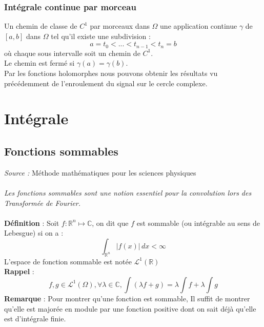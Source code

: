 \documentclass[a4paper]{book}
\begin{document}
\subsection{Intégrale continue par morceau}
Un chemin de classe de $C^1$ par morceaux dans $\Omega$ une application continue
$\gamma$ de $[a,b]$ dans $\Omega$ tel qu'il existe une subdivision :
\[
	a = t_0 < ... < t_{n-1} < t_n = b
\]
où chaque sous intervalle soit un chemin de $C^1$.\\ 

Le chemin est fermé si $\gamma(a) = \gamma(b)$.\\

Par les fonctions holomorphes nous pouvons obtenir les résultats vu
précédemment de l'enroulement du signal sur le cercle complexe.

\chapter{Intégrale}
\section{Fonctions sommables}
\emph{Source :} Méthode mathématiques pour les sciences physiques\\
\\
\emph{Les fonctions sommables sont une notion essentiel pour la convolution lors des
Transformée de Fourier.}
\\
\\
\textbf{Définition} : Soit $f : \mathbb{R}^{n} \mapsto \mathbb{C}$, on dit que
$f$ est sommable (ou  intégrable au sens de Lebesgue) si on a :
\begin{equation}
	\int_{\mathbb{R}^{n}} | f(x) | \, dx < \infty
\end{equation}
L'espace de fonction sommable est notée $\mathcal{L}^{1}(\mathbb{R})$\\
\textbf{Rappel} : 
\begin{equation}
	f,g \in \mathcal{L}^{1}(\Omega), \forall \lambda \in \mathbb{C}, \int
	(\lambda f + g) = \lambda \int f + \lambda \int g
\end{equation}
\textbf{Remarque} : Pour montrer qu'une fonction est sommable, 
Il suffit de montrer qu'elle est majorée en module par une
fonction positive dont on sait déjà qu'elle est d'intégrale finie.
\end{document}

